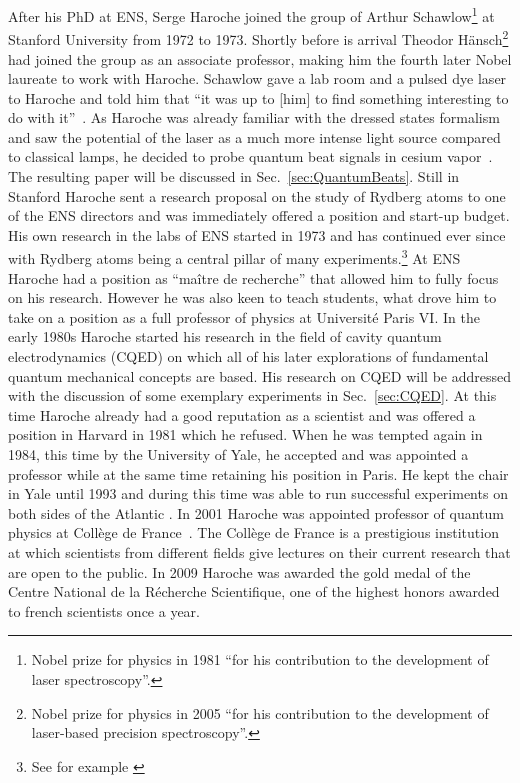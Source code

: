 After his PhD at ENS, Serge Haroche joined the group of Arthur
  Schawlow\footnote{Nobel prize for physics in 1981 ``for his contribution to
  the development of laser spectroscopy''. } at
Stanford University from 1972 to 1973. Shortly before is arrival Theodor
Hänsch\footnote{Nobel prize for physics in 2005 ``for his contribution to the
development of laser-based precision spectroscopy''.}
had joined the group as an associate professor, making him the fourth later
Nobel laureate to work with Haroche. Schawlow gave a lab room and a pulsed dye
laser to Haroche and told him that ``it was up to [him] to find something
interesting to do with it''~\cite{shbio}. As Haroche was already familiar with
the dressed states formalism and saw the potential of the laser as a much more
intense light source compared to classical lamps, he decided to probe
quantum beat signals in  cesium vapor~\cite{haroche1973hyperfine}. The resulting
paper will be discussed in Sec.~\ref{sec:QuantumBeats}. Still in Stanford
Haroche sent a research proposal on the study of Rydberg atoms to one of the ENS
directors and was immediately offered a position and start-up budget. His own
research in the labs of ENS started in 1973 and has continued ever since with
Rydberg atoms being a central pillar of many experiments.\footnote{See for example
\cite{haroche1983EnhancedSpontEm,haroche1990QND,haroche1999SinglePhoton,haroche2007QuantumJumps}}
At ENS Haroche had a position as ``maître de recherche'' that allowed him to
fully focus on his research. However he was also keen to teach students, what
drove him to take on a position as a full professor of physics at Université
Paris VI. In the early 1980s Haroche started his research in the field of cavity
quantum electrodynamics (CQED) on which all of his later explorations of
fundamental quantum mechanical concepts are based. His research on CQED will be
addressed with the discussion of some exemplary experiments in
Sec.~\ref{sec:CQED}. At this time Haroche already had a good reputation as a
scientist and was offered a position in Harvard in 1981 which he refused. When he
was tempted again in 1984, this time by the University of Yale, he accepted and
was appointed a professor while at the same time retaining his position in
Paris. He kept the chair in Yale until 1993 and during this time was able to run
successful experiments on both sides of the Atlantic
\cite{haroche1983EnhancedSpontEm, haroche1987SupressedEmission}. In 2001 Haroche
was appointed professor of quantum physics at Collège de
France~\cite{harocheCollege}. The Collège de France is a prestigious institution
at which scientists from different fields give lectures on their current
research that are open to the public. In 2009 Haroche was awarded the gold medal
of the Centre National de la Récherche Scientifique, one of the highest honors
awarded to french scientists once a year.

